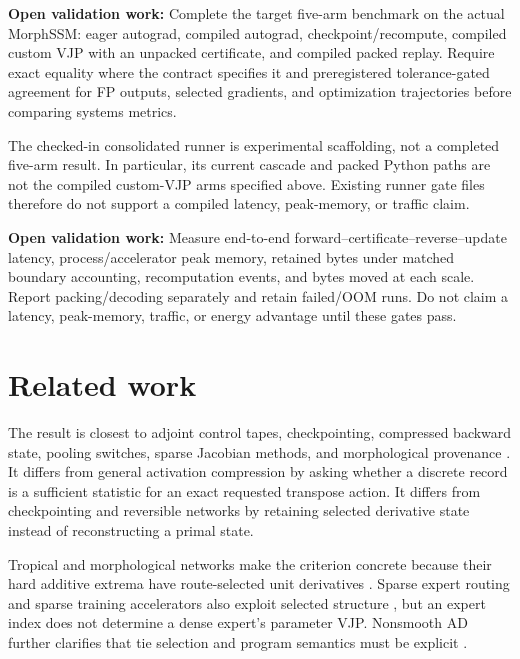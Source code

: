 \documentclass[10pt]{article}
\newcommand{\todo}[1]{\par\noindent\colorbox{Yellow!20}{\parbox{0.96\linewidth}{\textbf{Open validation work:} #1}}\par}
\begin{document}
\todo{Complete the target five-arm benchmark on the actual MorphSSM: eager
autograd, compiled autograd, checkpoint/recompute, compiled custom VJP with an
unpacked certificate, and compiled packed replay.  Require exact equality where
the contract specifies it and preregistered tolerance-gated agreement for FP
outputs, selected gradients, and optimization trajectories before comparing
systems metrics.}

The checked-in consolidated runner is experimental scaffolding, not a completed
five-arm result.  In particular, its current cascade and packed Python paths are
not the compiled custom-VJP arms specified above.  Existing runner gate files
therefore do not support a compiled latency, peak-memory, or traffic claim.

\todo{Measure end-to-end forward--certificate--reverse--update latency,
process/accelerator peak memory, retained bytes under matched boundary
accounting, recomputation events, and bytes moved at each scale.  Report
packing/decoding separately and retain failed/OOM runs.  Do not claim a latency,
peak-memory, traffic, or energy advantage until these gates pass.}



\section{Related work}

The result is closest to adjoint control tapes, checkpointing, compressed
backward state, pooling switches, sparse Jacobian methods, and morphological
provenance \citep{giering1998recipes,griewank2000revolve,coleman1998sparse,zeiler2014visualizing,jain2018gist,novikov2023fewbit,groenendijk2023geometric}.
It differs from general activation compression by asking whether a discrete
record is a sufficient statistic for an exact requested transpose action.
It differs from checkpointing and reversible networks by retaining selected
derivative state instead of reconstructing a primal state.

Tropical and morphological networks make the criterion concrete because their
hard additive extrema have route-selected unit derivatives
\citep{zhang2018tropical,franchi2020morphological}.  Sparse expert routing and
sparse training accelerators also exploit selected structure
\citep{shazeer2017moe,parashar2017scnn,yang2020procrustes}, but an expert index
does not determine a dense expert's parameter VJP.  Nonsmooth AD further
clarifies that tie selection and program semantics must be explicit
\citep{bolte2023nonsmooth}.
\end{document}
